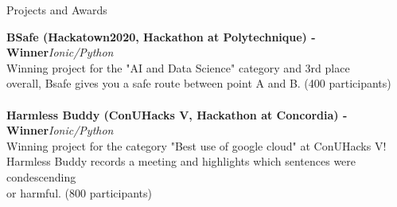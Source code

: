 \documentclass[10pt]{resume} %
\begin{document}
\begin{rSection}{Projects and Awards}

{\bf BSafe (Hackatown2020, Hackathon at Polytechnique) - Winner}\hfill {\em Ionic/Python}\\
Winning project for the "AI and Data Science" category and 3rd place \\ overall, Bsafe gives you a safe route between point A and B. (400 participants)\\ \\
{\bf Harmless Buddy (ConUHacks V, Hackathon at Concordia) - Winner}\hfill {\em Ionic/Python}\\
Winning project for the category "Best use of google cloud" at ConUHacks V! \\Harmless Buddy records a meeting and highlights which sentences were condescending \\or harmful. (800 participants)

\end{rSection}
\end{document}
